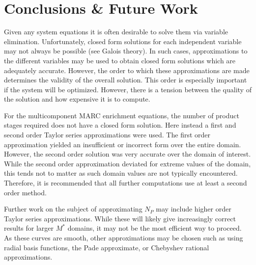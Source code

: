 \documentclass{ansconf}
\begin{document}
\section{Conclusions \& Future Work}
\label{sec:conc}

Given any system equations it is often desirable to solve them via variable 
elimination.  Unfortunately, closed form solutions for each independent variable
may not always be possible (see Galois theory).  In such cases, approximations to 
the different variables may be used to obtain closed form solutions which are
adequately accurate.  However, the order to which these approximations are made
determines the validity of the overall solution.  This order is especially 
important if the system will be optimized.  However, there is a tension between 
the quality of the solution and how expensive it is to compute.

For the multicomponent MARC enrichment equations, the number of product stages 
required does not have a closed form solution.  Here instead a first and second 
order Taylor series approximations were used.  The first order approximation 
yielded an insufficient or incorrect form over the entire domain.  However, 
the second order solution was very accurate over the domain of interest.  While 
the second order approximation deviated for extreme values of the domain, this 
tends not to matter as such domain values are not typically encountered.  
Therefore, it is recommended that all further computations use at least a second order
method.

Further work on the subject of approximating $N_P$ may include higher order Taylor
series approximations.  While these will likely give increasingly correct results 
for larger $M^*$ domains, it may not be the most efficient way to proceed.  
As these curves are smooth, other approximations may be chosen such as using 
radial basis functions, the Pade approximate, or Chebyshev rational approximations.

\setlength{\baselineskip}{12pt}



\end{document}
